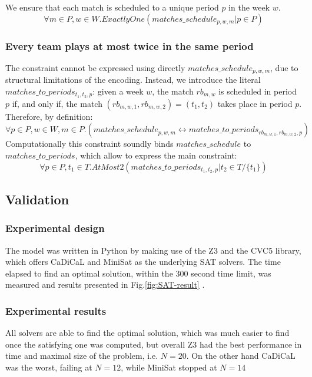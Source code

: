 We ensure that each match is scheduled to a unique period $p$ in the week $w$.
$$
    \forall m \in P, w \in W. ExactlyOne(matches\_schedule_{p, w, m} | p \in P)
$$
\subsubsection{Every team plays at most twice in the same period}
The constraint cannot be expressed using directly $matches\_schedule_{p, w, m}$, due to structural limitations of the encoding. 
Instead, we introduce the literal $matches\_to\_periods_{t_1, t_2, p}$: given a week $w$, the match $rb_{m,w}$ is scheduled in period $p$ if, and only if, the match $(rb_{m, w, 1}, rb_{m, w, 2}) = (t_1, t_2)$ takes place in period $p$. Therefore, by definition: 
$$
    \forall p \in P, w \in W, m \in P.(matches\_schedule_{p, w, m} \leftrightarrow matches\_to\_periods_{rb_{m, w, 1}, rb_{m, w, 2}, p})
$$
Computationally this constraint soundly binds $matches\_schedule$ to \\$matches\_to\_periods$, which allow to express the main constraint:
$$
    \forall p \in P, t_1 \in T. AtMost2(matches\_to\_periods_{t_1, t_2, p} | t_2 \in T/\{t_1\})
$$
\subsection{Validation}
\subsubsection{Experimental design}
The model was written in Python by making use of the Z3 and the CVC5 library, which offers CaDiCaL and MiniSat as the underlying SAT solvers. The time elapsed to find an optimal solution, within the 300 second time limit, was measured and results presented in Fig.\ref{fig:SAT-result} . 
\subsubsection{Experimental results}
All solvers are able to find the optimal solution, which was much easier to find once the satisfying one was computed, but overall Z3 had the best performance in time and maximal size of the problem, i.e. $N=20$. On the other hand CaDiCaL was the worst, failing at $N=12$, while MiniSat stopped at $N=14$

